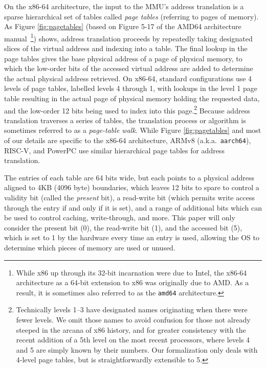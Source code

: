 On the x86-64 architecture, the input to the \textsc{MMU}'s address translation is a sparse hierarchical set of tables 
called \emph{page tables} (referring to pages of memory). As Figure \ref{fig:pagetables} (based on Figure 5-17 of the 
AMD64 architecture manual~\cite{amd64_manual_vol2}\footnote{While x86 up through its 32-bit incarnation were due to Intel,
the x86-64 architecture as a 64-bit extension to x86 was originally due to AMD. As a result, it is sometimes also referred to as the \texttt{amd64} architecture.}) shows, 
address translation proceeds by repeatedly taking designated slices of the virtual address and indexing into a table.
The final lookup in the page tables gives the base physical address of a page of physical memory, to which the low-order
bits of the accessed virtual address are added to determine the actual physical address retrieved. 
On x86-64, standard configurations use 4 levels of page tables, labelled levels 4 through 1, with lookups in the level 
1 page table resulting in the actual page of physical memory holding the requested data, and the low-order 12 bits 
being used to index into this page.\footnote{Technically levels 1--3 have designated names originating when there were 
fewer levels. We omit those names to avoid confusion for those not already steeped in the arcana of x86 history,
 and for greater consistency with the recent addition of a 5th level 
on the most recent processors, where levels 4 and 5 are simply known by their numbers. Our formalization
only deals with 4-level page tables, but is straightforwardly extensible to 5.}  
Because address translation 
traverses a series of tables, the translation process or algorithm is sometimes referred to as a \emph{page-table walk}. 
While Figure \ref{fig:pagetables} and most of our details are specific to the x86-64 architecture, ARMv8 (a.k.a.\ 
\texttt{aarch64}), RISC-V, and PowerPC use similar hierarchical page tables for address translation.

The entries of each table are 64 bits wide, but each points to a physical address aligned to 4KB (4096 byte) boundaries, which leaves 12 bits to spare to control a validity bit (called the \emph{present} bit), a read-write bit (which permits write access through the entry if and only if it is set), and a range of additional bits which can be used to control caching, write-through, and more. This paper will only consider the present bit (0), the read-write bit (1), and the accessed bit (5), which is set to 1 by the hardware every time an entry is used, allowing the OS to determine which pieces of memory are used or unused.

